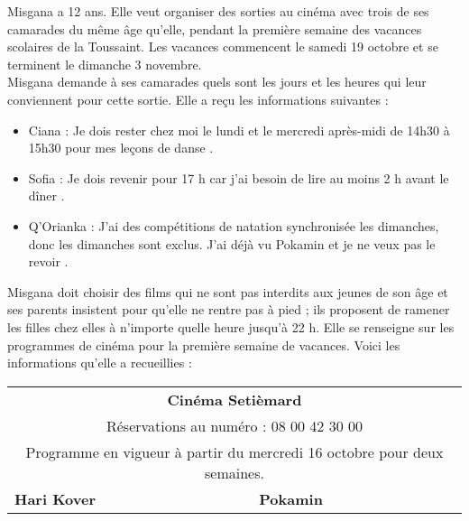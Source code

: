 \vspace*{-15mm}
\begin{enigme}
    \begin{changemargin}{-10mm}{-10mm}
        \vspace*{-5mm}
        Misgana a 12 ans. Elle veut organiser des sorties au cinéma avec trois de ses camarades du même âge qu'elle, pendant la première semaine des vacances scolaires de la Toussaint. Les vacances commencent le samedi 19 octobre et se terminent le dimanche 3 novembre. \\
        Misgana demande à ses camarades quels sont les jours et les heures qui leur conviennent pour cette sortie. Elle a reçu les informations suivantes :
        \begin{itemize}
            \item Ciana : \og Je dois rester chez moi le lundi et le mercredi après-midi de 14h30 à 15h30 pour mes leçons de danse \fg.
            \item Sofia : \og Je dois revenir pour 17 h car j'ai besoin de lire au moins 2 h avant le dîner \fg.
            \item Q'Orianka : \og J'ai des compétitions de natation synchronisée les dimanches, donc les dimanches sont exclus. J'ai déjà vu Pokamin et je ne veux pas le revoir \fg.
        \end{itemize}
        Misgana doit choisir des films qui ne sont pas interdits aux jeunes de son âge et ses parents insistent pour qu'elle ne rentre pas à pied ; ils proposent de ramener les filles chez elles à n'importe quelle heure jusqu'à 22 h. Elle se renseigne sur les programmes de cinéma pour la première semaine de vacances. Voici les informations qu'elle a recueillies :       
        \begin{center}
            {\small
            \begin{tabular}{|p{4cm}p{1.8cm}|p{4cm}p{1.8cm}|}
                \hline
                \multicolumn{4}{|c|}{\bf Cinéma Setièmard} \\
                \multicolumn{4}{|c|}{Réservations au numéro : 08 00 42 30 00} \\
                \multicolumn{4}{|c|}{Programme en vigueur à partir du mercredi 16 octobre pour deux semaines.} \\
                \hline
                \bf Hari Kover & & \bf Pokamin & \\

\end{tabular}}
\end{center}
\end{changemargin}
\end{enigme}
